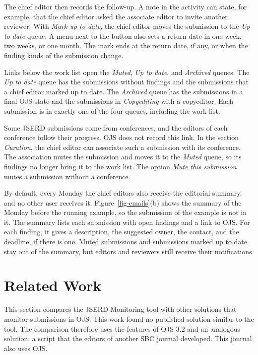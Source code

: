 \documentclass[12pt]{article}
\begin{document}
The chief editor then records the follow-up. A note in the activity can
state, for example, that the chief editor asked the associate editor to
invite another reviewer. With \textit{Mark up to date}, the chief editor
moves the submission to the \textit{Up to date} queue. A menu next to the
button also sets a return date in one week, two weeks, or one month.
The mark ends at the return date, if any, or when the finding kinds of the
submission change.

Links below the work list open the \textit{Muted}, \textit{Up to date}, and
\textit{Archived} queues. The \textit{Up to date} queue has the
submissions without findings and the submissions that a chief editor
marked up to date. The \textit{Archived} queue has the submissions in
a final OJS state and the submissions in \textit{Copyediting} with a
copyeditor. Each submission is in exactly one of the four queues, including
the work list.

Some JSERD submissions come from conferences, and the editors of each
conference follow their progress. OJS does not record this link. In the
section \textit{Curation}, the chief editor can associate such a submission
with its conference. The association mutes the submission and moves it to
the \textit{Muted} queue, so its findings no longer bring it to the work
list. The option \textit{Mute this submission} mutes a submission without a
conference.

By default, every Monday the chief editors also receive the editorial
summary, and no other user receives it. Figure~\ref{fig-emails}(b) shows
the summary of the Monday before the running example, so the submission of
the example is not in it. The summary lists each submission with open
findings and a link to OJS. For each finding, it gives a description, the
suggested owner, the contact, and the deadline, if there is one. Muted submissions and submissions marked up to
date stay out of the summary, but editors and reviewers still receive their
notifications.

\section{Related Work}
\label{sec-related-work}

This section compares the JSERD Monitoring tool with other solutions that
monitor submissions in OJS. This work found no published solution similar to
the tool. The comparison therefore uses the features of OJS 3.2 and an
analogous solution, a script that the editors of another SBC journal
developed. This journal also uses OJS.
\end{document}
